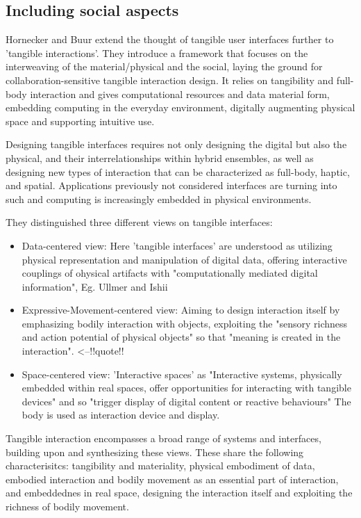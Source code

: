 \subsection{Including social aspects}
Hornecker and Buur \cite{hornecker06} extend the thought of tangible user interfaces further to 'tangible interactions'. They introduce a framework that focuses on the interweaving of the material/physical and the social, laying the ground for collaboration-sensitive tangible interaction design. It relies on tangibility and full-body interaction and gives computational resources and data material form, embedding computing in the everyday environment, digitally augmenting physical space and supporting intuitive use. 

Designing tangible interfaces requires not only designing the digital but also the physical, and their interrelationships within hybrid ensembles, as well as designing new types of interaction that can be characterized as full-body, haptic, and spatial.
Applications previously not considered interfaces are turning into such and computing is increasingly embedded in physical environments.

They distinguished three different views on tangible interfaces:
\begin{itemize}
\item Data-centered view: Here 'tangible interfaces' are understood as utilizing physical representation and manipulation of digital data, offering interactive couplings of ohysical artifacts with "computationally mediated digital information", Eg. Ullmer and Ishii
\item Expressive-Movement-centered view: Aiming to design interaction itself by emphasizing bodily interaction with objects, exploiting the "sensory richness and action potential of physical objects" so that "meaning is created in the interaction". <--!!quote!!
\item Space-centered view: 'Interactive spaces' as "Interactive systems, physically embedded within real spaces, offer opportunities for interacting with tangible devices" and so "trigger display of digital content or reactive behaviours" The body is used as interaction device and display.
\end{itemize}

Tangible interaction encompasses a broad range of systems and interfaces, building upon and synthesizing these views. These share the following characterisitcs: tangibility and materiality, physical embodiment of data, embodied interaction and bodily movement as an essential part of interaction, and embeddednes in real space, designing the interaction itself and exploiting the richness of bodily movement.

